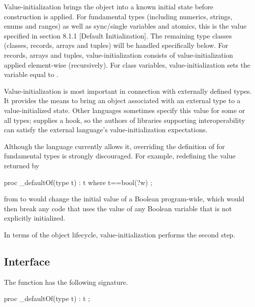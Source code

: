 Value-initialization brings the object into a known initial state before
construction is applied.  For fundamental types (including numerics, strings,
enums and ranges) as well as sync/single variables and atomics, this is the
value specified in section 8.1.1 [Default Initialization].  The remaining type
classes (classes, records, arrays and tuples) will be handled specifically below.
For records, arrays and tuples, value-initialization consists of
value-initialization applied element-wise (recursively).  For class variables,
value-initialization sets the variable equal to .

Value-initialization is most important in connection with externally defined
types.  It provides the means to bring an object associated with an external
type to a value-initialized state.  Other languages sometimes specify this value
for some or all types;  supplies a hook, so the authors of
libraries supporting interoperability can satisfy the external language's
value-initialization expectations.

Although the language currently allows it, overriding the definition
of  for fundamental types is strongly discouraged.  For
example, redefining the value returned by
\begin{chapel}
proc _defaultOf(type t) : t where t==bool(?w) ;
\end{chapel}
from  to  would change the initial value of a
Boolean program-wide, which would then break any code that uses the value of any
Boolean variable that is not explicitly initialized.

In terms of the object lifecycle, value-initialization performs the second step.  

\subsection{Interface}

The  function has
the following signature.
\begin{chapel}
proc _defaultOf(type t) : t ;
\end{chapel}

